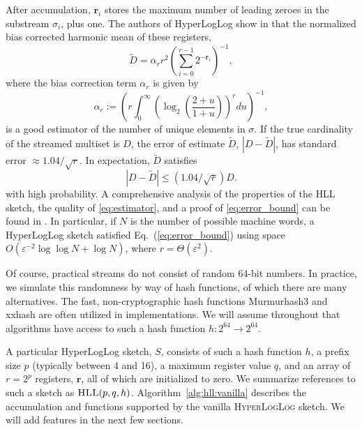 \documentclass{report}
\newcommand{\algoname}[1]{\textnormal{\textsc{#1}}}
\begin{document}
After accumulation, $\mathbf{r}_i$ stores the maximum number of leading zeroes in the substream $\sigma_i$, plus one. 
The authors of HyperLogLog show in \cite{flajolet2007hyperloglog} that the normalized bias corrected harmonic mean of these registers,
%
\begin{equation} \label{eq:estimator}
\widetilde{D} = \alpha_r r^2 \left ( \sum_{i=0}^{r-1} 2^{-\mathbf{r}_i} \right) ^{-1},
\end{equation}
%
where the bias correction term $\alpha_r$ is given by
%
%
\begin{equation} \label{eq:alpha}
\alpha_r :=  \left( r \int_{0}^\infty \left( \log_2 \left( \frac{2 + u}{1 + u} \right) \right)^r du \right) ^{-1},
\end{equation}
is a good estimator of the number of unique elements in $\sigma$.
If the true cardinality of the streamed multiset is $D$, the error of estimate $\widetilde{D}$, $|D - \widetilde{D}|$, has standard error $\approx 1.04 / \sqrt{r}$. 
In expectation, $\widetilde{D}$ satisfies
%
\begin{equation} \label{eq:error_bound}
|D - \widetilde{D}| \leq (1.04/\sqrt{r}) D.
\end{equation}
%
 with high probability.
A comprehensive analysis of the properties of the \algoname{HLL} sketch,  the quality of \eqref{eq:estimator}, and a proof of \eqref{eq:error_bound}  can be found in \cite{flajolet2007hyperloglog}.
In particular, if $N$ is the number of possible machine words, a HyperLogLog sketch satisfied Eq.~(\ref{eq:error_bound}) using space $O(\varepsilon^{-2} \log\log N + \log N)$, where $r = \Theta(\varepsilon^2)$.

Of course, practical streams do not consist of random 64-bit numbers. 
In practice, we simulate this randomness by way of hash functions, of which there are many alternatives. 
The fast, non-cryptographic hash functions Murmurhash3 \cite{murmurhash3} and xxhash \cite{xxhash} are often utilized in implementations. 
We will assume throughout that algorithms have access to such a hash function $h : 2^{64} \rightarrow 2^{64}$.

A particular HyperLogLog sketch, $S$, consists of such a hash function $h$, a prefix size $p$ (typically between 4 and 16), a maximum register value $q$, and an array of $r=2^p$ registers, $\mathbf{r}$, all of which are initialized to zero. 
We summarize references to such a sketch as $\algoname{HLL}(p,q,h)$.
Algorithm~\ref{alg:hll:vanilla} describes the accumulation and functions supported by the vanilla \algoname{HyperLogLog} sketch. 
We will add features in the next few sections. 
\end{document}

